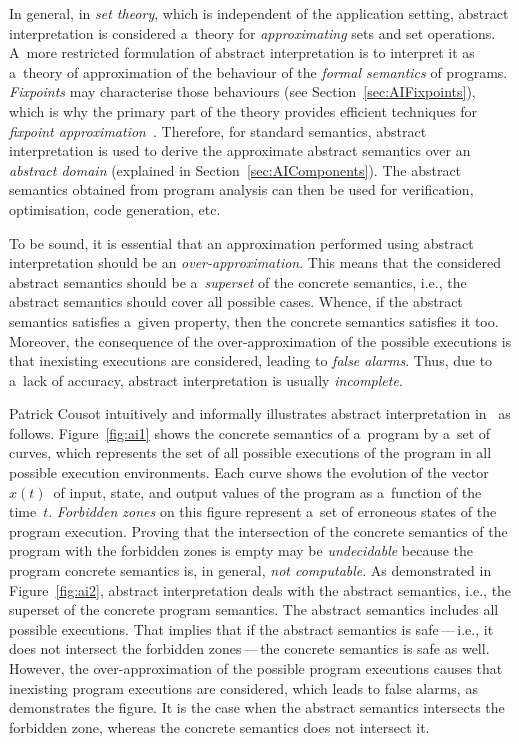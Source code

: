 In general, in \emph{set theory}, which is independent of the application setting, abstract interpretation is considered a~theory for \emph{approximating} sets and set operations. A~more restricted formulation of abstract interpretation is to interpret it as a~theory of approximation of the behaviour of the \emph{formal semantics} of programs. \emph{Fixpoints} may characterise those behaviours (see Section~\ref{sec:AIFixpoints}), which is why the primary part of the theory provides efficient techniques for \emph{fixpoint approximation}~\cite{programAnalysisNielson}. Therefore, for standard semantics, abstract interpretation is used to derive the approximate abstract semantics over an \emph{abstract domain} (explained in Section~\ref{sec:AIComponents}). The abstract semantics obtained from program analysis can then be used for verification, optimisation, code generation, etc.~\cite{AIBasedFormalMethodsCousot}

To be sound, it is essential that an approximation performed using abstract interpretation should be an \emph{over-approximation}. This means that the considered abstract semantics should be a~\emph{superset} of the concrete semantics, i.e., the abstract semantics should cover all possible cases. Whence, if the abstract semantics satisfies a~given property, then the concrete semantics satisfies it too. Moreover, the consequence of the over-approximation of the possible executions is that inexisting executions are considered, leading to \emph{false alarms}. Thus, due to a~lack of accuracy, abstract interpretation is usually \emph{incomplete}.~\cite{AIInNutshellCousot}

Patrick Cousot intuitively and informally illustrates abstract interpretation in~\cite{AIInNutshellCousot} as follows. Figure~\ref{fig:ai1} shows the concrete semantics of a~program by a~set of curves, which represents the set of all possible executions of the program in all possible execution environments. Each curve shows the evolution of the vector~$ x(t) $~of input, state, and output values of the program as a~function of the time~$ t $. \emph{Forbidden zones} on this figure represent a~set of erroneous states of the program execution. Proving that the intersection of the concrete semantics of the program with the forbidden zones is empty may be \emph{undecidable} because the program concrete semantics is, in general, \emph{not computable}. As demonstrated in Figure~\ref{fig:ai2}, abstract interpretation deals with the abstract semantics, i.e., the superset of the concrete program semantics. The abstract semantics includes all possible executions. That implies that if the abstract semantics is safe\,---\,i.e., it does not intersect the forbidden zones\,---\,the concrete semantics is safe as well. However, the over-approximation of the possible program executions causes that inexisting program executions are considered, which leads to false alarms, as demonstrates the figure. It is the case when the abstract semantics intersects the forbidden zone, whereas the concrete semantics does not intersect it.

